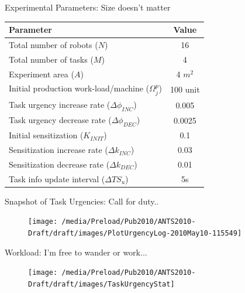 \documentclass{beamer}
\begin{document}
\begin{frame}[t]{Experimental Parameters: \alert{Size doesn't matter}}
\begin{table}
\label{table:params}
\begin{small}
\begin{center}
\begin{tabular}{|l||c|}
\hline Parameter & Value\\
\hline Total number of robots ($N$) & 16\\
\hline Total number of tasks ($M$) & 4\\
\hline Experiment area ($A$) & 4 $m^2$\\
\hline Initial production work-load/machine ($\Omega_{j}^{p}$) & 100 unit\\
\hline Task urgency increase rate ($\Delta\phi_{INC}$) & 0.005\\
\hline Task urgency decrease rate ($\Delta\phi_{DEC}$) & 0.0025\\
\hline Initial sensitization ($K_{INIT}$) & 0.1\\
\hline Sensitization increase rate ($\Delta k_{INC}$) & 0.03\\
\hline Sensitization decrease rate ($\Delta k_{DEC}$) & 0.01\\
\hline Task info update interval ($\Delta TS_{u}$) & 5s\\
\hline
\end{tabular}
\end{center}
\end{small}
\end{table}
\end{frame}
\begin{frame}[t]{Snapshot of Task Urgencies: \alert{Call for duty..}}
\begin{figure}
\centering
\texttt{[image: /media/Preload/Pub2010/ANTS2010-Draft/draft/images/PlotUrgencyLog-2010May10-115549]}
\label{fig:setup} %
\end{figure}
\end{frame}
\begin{frame}[t]{Workload: \alert{I'm free to wander or work...}}
\begin{figure}
\centering
\texttt{[image: /media/Preload/Pub2010/ANTS2010-Draft/draft/images/TaskUrgencyStat]}
\label{fig:setup} %
\end{figure}
\end{frame}
\end{document}
